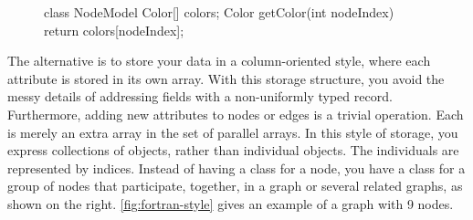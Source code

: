 \newcommand{\light}[1]{\footnotesize{\textcolor{Lighter}{#1}}}

\begin{figure}
\begin{framedlisting}
class NodeModel {
  Color[] colors;
  Color getColor(int nodeIndex) {
    return colors[nodeIndex];
  }
}
\end{framedlisting}
\end{figure}
The alternative is to store your data in a column-oriented style, where each
attribute is stored in its own array. With this storage structure, you avoid the messy details
of addressing fields with a non-uniformly typed record. Furthermore, adding new
attributes to nodes or edges is a trivial operation. Each is merely an extra
array in the set of parallel arrays.
In this style of storage, you express
collections of objects, rather than individual objects. The individuals are
represented by indices. Instead of having a class for a node, you have a class
for a group of nodes that participate, together, in a graph or several related
graphs, as shown on the right.
\autoref{fig:fortran-style} gives an example of a graph with 9 nodes.

